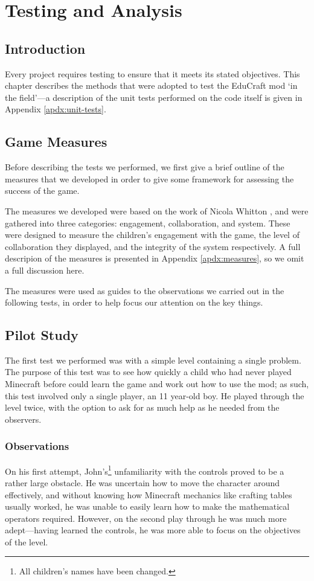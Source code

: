 \chapter{Testing and Analysis}
\label{ch:testing}

\section{Introduction}
Every project requires testing to ensure that it meets its stated objectives.
This chapter describes the methods that were adopted to test the EduCraft mod
`in the field'---a description of the unit tests performed on the code itself
is given in Appendix \ref{apdx:unit-tests}.


\section{Game Measures}
Before describing the tests we performed, we first give a brief outline of the
measures that we developed in order to give some framework for assessing the success
of the game.

The measures we developed were based on the work of Nicola Whitton \cite{whitton07},
and were gathered into three categories: engagement, collaboration, and system.
These were designed to measure the children's engagement with the game, the level
of collaboration they displayed, and the integrity of the system respectively.
A full descripion of the measures is presented in Appendix \ref{apdx:measures}, so
we omit a full discussion here.

The measures were used as guides to the observations we carried out in the following
tests, in order to help focus our attention on the key things.


\section{Pilot Study}
The first test we performed was with a simple level containing a single problem. The
purpose of this test was to see how quickly a child who had never played Minecraft
before could learn the game and work out how to use the mod; as such, this test
involved only a single player, an 11 year-old boy. He played through the level
twice, with the option to ask for as much help as he needed from the observers.

\subsection{Observations}
On his first attempt, John's\footnote{All children's names have been changed.} unfamiliarity
with the controls proved to be a rather large obstacle. He was uncertain how to move
the character around effectively, and without knowing how Minecraft mechanics like
crafting tables usually worked, he was unable to easily learn how to make the mathematical
operators required. However, on the second play through he was much more adept---having
learned the controls, he was more able to focus on the objectives of the level.

